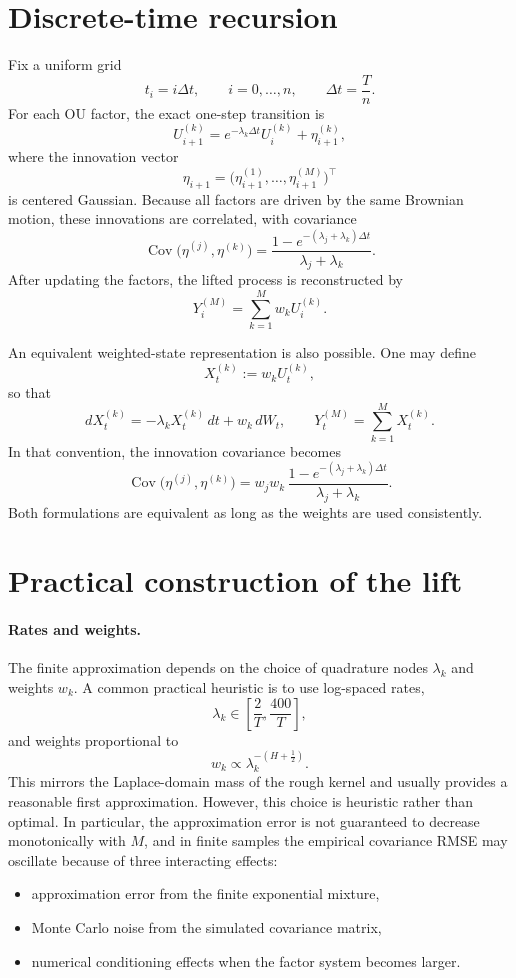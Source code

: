 \documentclass[a4paper,10pt,titlepage,oneside,openany]{book}
\theoremstyle{plain}
\theoremstyle{definition}
\theoremstyle{remark}
\newcommand{\Cov}{\operatorname{Cov}}
\newcommand{\1}{\mathbf{1}}
\begin{document}
\section{Discrete-time recursion}

Fix a uniform grid
\[
t_i=i\Delta t,
\qquad i=0,\dots,n,
\qquad \Delta t=\frac{T}{n}.
\]
For each OU factor, the exact one-step transition is
\[
U_{i+1}^{(k)}=e^{-\lambda_k\Delta t}U_i^{(k)}+\eta_{i+1}^{(k)},
\]
where the innovation vector
\[
\eta_{i+1}=
\bigl(\eta_{i+1}^{(1)},\dots,\eta_{i+1}^{(M)}\bigr)^\top
\]
is centered Gaussian. Because all factors are driven by the same Brownian motion, these innovations are correlated, with covariance
\[
\Cov\!\bigl(\eta^{(j)},\eta^{(k)}\bigr)
=
\frac{1-e^{-(\lambda_j+\lambda_k)\Delta t}}{\lambda_j+\lambda_k}.
\]
After updating the factors, the lifted process is reconstructed by
\[
Y_i^{(M)}=\sum_{k=1}^M w_k U_i^{(k)}.
\]

An equivalent weighted-state representation is also possible. One may define
\[
X_t^{(k)}:=w_k U_t^{(k)},
\]
so that
\[
dX_t^{(k)}=-\lambda_k X_t^{(k)}\,dt+w_k\,dW_t,
\qquad
Y_t^{(M)}=\sum_{k=1}^M X_t^{(k)}.
\]
In that convention, the innovation covariance becomes
\[
\Cov\!\bigl(\eta^{(j)},\eta^{(k)}\bigr)
=
w_jw_k\,
\frac{1-e^{-(\lambda_j+\lambda_k)\Delta t}}{\lambda_j+\lambda_k}.
\]
Both formulations are equivalent as long as the weights are used consistently.

\section{Practical construction of the lift}

\paragraph{Rates and weights.}

The finite approximation depends on the choice of quadrature nodes \(\lambda_k\) and weights \(w_k\). A common practical heuristic is to use log-spaced rates,
\[
\lambda_k \in \left[\frac{2}{T},\frac{400}{T}\right],
\]
and weights proportional to
\[
w_k \propto \lambda_k^{-(H+\frac12)}.
\]
This mirrors the Laplace-domain mass of the rough kernel and usually provides a reasonable first approximation. However, this choice is heuristic rather than optimal. In particular, the approximation error is not guaranteed to decrease monotonically with \(M\), and in finite samples the empirical covariance RMSE may oscillate because of three interacting effects:
\begin{itemize}
    \item approximation error from the finite exponential mixture,
    \item Monte Carlo noise from the simulated covariance matrix,
    \item numerical conditioning effects when the factor system becomes larger.
\end{itemize}
\end{document}
